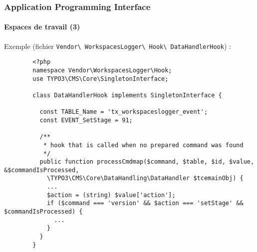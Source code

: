 
\begin{frame}[fragile]
	\frametitle{Application Programming Interface}
	\framesubtitle{Espaces de travail (3)}

	Exemple (fichier \texttt{Vendor\textbackslash
		WorkspacesLogger\textbackslash
		Hook\textbackslash
		DataHandlerHook}) :

	\lstset{
		basicstyle=\tiny\ttfamily
	}

	\begin{lstlisting}
		<?php
		namespace Vendor\WorkspacesLogger\Hook;
		use TYPO3\CMS\Core\SingletonInterface;

		class DataHandlerHook implements SingletonInterface {

		  const TABLE_Name = 'tx_workspaceslogger_event';
		  const EVENT_SetStage = 91;

		  /**
		   * hook that is called when no prepared command was found
		   */
		  public function processCmdmap($command, $table, $id, $value, &$commandIsProcessed,
		    \TYPO3\CMS\Core\DataHandling\DataHandler $tcemainObj) {
		    ...
		    $action = (string) $value['action'];
		    if ($command === 'version' && $action === 'setStage' && $commandIsProcessed) {
		      ...
		    }
		  }
		}
	\end{lstlisting}

\end{frame}


